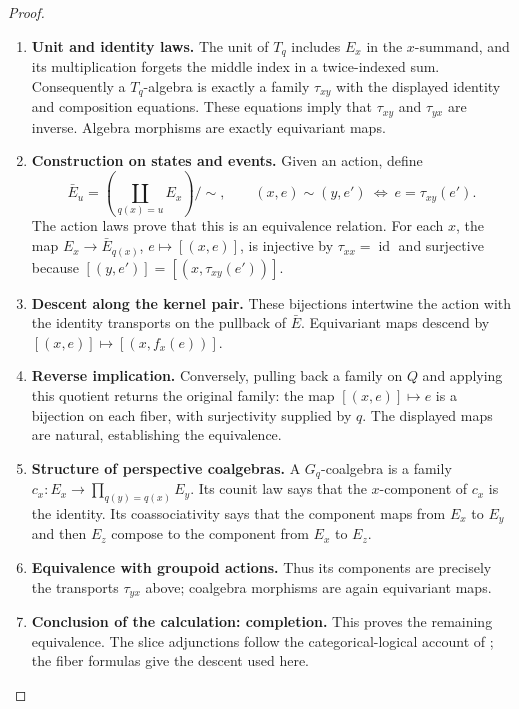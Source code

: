 \documentclass[11pt,a4paper]{article}
\numberwithin{equation}{section}
\theoremstyle{definition}
\theoremstyle{remark}
\theoremstyle{plain}
\begin{document}
\begin{proof}
\leavevmode
\begin{enumerate}[label=\textup{(\arabic*)},leftmargin=*,itemsep=4pt,topsep=3pt]
  \item \textbf{Unit and identity laws.} The unit of $T_q$ includes $E_x$ in the $x$-summand, and its
multiplication forgets the middle index in a twice-indexed sum. Consequently a $T_q$-algebra is exactly a family $\tau_{xy}$ with the
displayed identity and composition equations. These equations imply that
$\tau_{xy}$ and $\tau_{yx}$ are inverse. Algebra morphisms are exactly
equivariant maps.
  \item \textbf{Construction on states and events.} Given an action, define
\[
 \bar E_u=\left(\coprod_{q(x)=u}E_x\right)/\sim,
 \qquad (x,e)\sim(y,e')\ \Longleftrightarrow\ e=\tau_{xy}(e').
\]
The action laws prove that this is an equivalence relation. For each $x$,
the map $E_x\to\bar E_{q(x)}$, $e\mapsto[(x,e)]$, is injective by
$\tau_{xx}=\operatorname{id}$ and surjective because
$[(y,e')]=[(x,\tau_{xy}(e'))]$.
  \item \textbf{Descent along the kernel pair.} These bijections intertwine the action
with the identity transports on the pullback of $\bar E$. Equivariant
maps descend by $[(x,e)]\mapsto[(x,f_x(e))]$.
  \item \textbf{Reverse implication.} Conversely, pulling back a
family on $Q$ and applying this quotient returns the original family:
the map $[(x,e)]\mapsto e$ is a bijection on each fiber, with
surjectivity supplied by $q$. The displayed maps are natural, establishing
the equivalence.
  \item \textbf{Structure of perspective coalgebras.} A $G_q$-coalgebra is a family $c_x:E_x\to\prod_{q(y)=q(x)}E_y$. Its counit law says that the $x$-component of $c_x$ is the identity. Its coassociativity says that the component maps from $E_x$ to $E_y$
and then $E_z$ compose to the component from $E_x$ to $E_z$.
  \item \textbf{Equivalence with groupoid actions.} Thus its components are precisely the transports $\tau_{yx}$ above;
coalgebra morphisms are again equivariant maps.
  \item \textbf{Conclusion of the calculation: completion.} This proves the remaining
equivalence. The slice adjunctions follow the categorical-logical account of \citet{Jacobs1999}; the fiber formulas give the descent used here.
\end{enumerate}
\end{proof}
\end{document}
